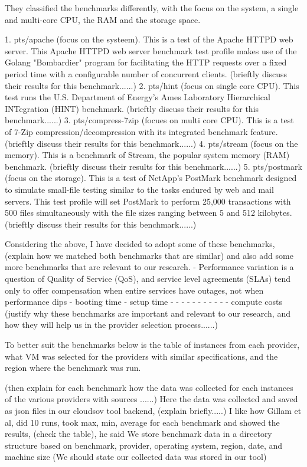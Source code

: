 They classified the benchmarks differently, with the focus on the system, a single and multi-core CPU, the RAM and the storage space. 

1. pts/apache (focus on the systeem). This is a test of the Apache HTTPD web server. This Apache HTTPD web server benchmark test profile makes use of the Golang "Bombardier" program for facilitating the HTTP requests over a fixed period time with a configurable number of concurrent clients. 
(brieftly discuss their results for this benchmark......)
2. pts/hint (focus on single core CPU). This test runs the U.S. Department of Energy's Ames Laboratory Hierarchical INTegration (HINT) benchmark.
(brieftly discuss their results for this benchmark......)
3. pts/compress-7zip (focues on multi core CPU). This is a test of 7-Zip compression/decompression with its integrated benchmark feature.
(brieftly discuss their results for this benchmark......)
4. pts/stream (focus on the memory). This is a benchmark of Stream, the popular system memory (RAM) benchmark.
(brieftly discuss their results for this benchmark......)
5. pts/postmark (focus on the storage). This is a test of NetApp's PostMark benchmark designed to simulate small-file testing similar to the tasks endured by web and mail servers. This test profile will set PostMark to perform 25,000 transactions with 500 files simultaneously with the file sizes ranging between 5 and 512 kilobytes.
(brieftly discuss their results for this benchmark......)



Considering the above, I have decided to adopt some of these benchmarks, (explain how we matched both benchmarks that are similar) and also add some more benchmarks that are relevant to our research.
- Performance variation is a question of Quality of Service (QoS), and service level agreements (SLAs) tend only to offer compensation when entire services have outages, not when performance dips
- booting time
- setup time 
-
- 
- 
-
- 
- 
- 
- 
- 
- 
- compute costs 
(justify why these benchmarks are important and relevant to our research, and how they will help us in the provider selection process......)


To better suit the benchmarks below is the table of instances from each provider, what VM was  selected for the providers with similar specifications, and the region where the benchmark was run. 


(then explain for each benchmark how the data was collected for each instances of the various providers with sources ......)
Here the data was collected and saved as json files in our cloudsov tool backend, (explain briefly.....)
I like how Gillam et al, did 10 runs, took max, min, average for each benchmark and showed the results, (check the table), he said We store benchmark data in a directory structure based on benchmark, provider, operating system, region, date, and machine size (We should state our collected data was stored in our tool)

